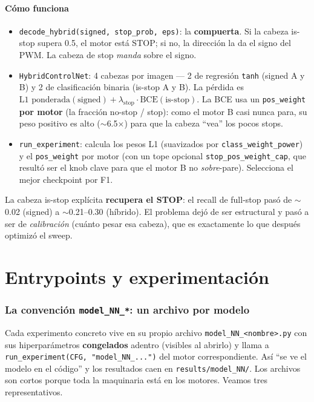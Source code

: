 \documentclass[11pt,a4paper]{article}
\newcommand{\code}[1]{\lstinline[basicstyle=\ttfamily\normalsize]|#1|}
\begin{document}


\subsection*{Cómo funciona}
\begin{itemize}
  \item \code{decode_hybrid(signed, stop_prob, eps)}: la \textbf{compuerta}. Si la cabeza is-stop supera 0.5,
  el motor está STOP; si no, la dirección la da el signo del PWM. La cabeza de stop \emph{manda} sobre el signo.
  \item \code{HybridControlNet}: 4 cabezas por imagen --- 2 de regresión \code{tanh} (signed A y B) y 2 de
  clasificación binaria (is-stop A y B). La pérdida es
  $\text{L1 ponderada}(\text{signed}) + \lambda_{\text{stop}}\cdot\text{BCE}(\text{is-stop})$. La BCE usa un
  \code{pos_weight} \textbf{por motor} (la fracción no-stop / stop): como el motor B casi nunca para, su peso
  positivo es alto ($\sim$6.5$\times$) para que la cabeza ``vea'' los pocos stops.
  \item \code{run_experiment}: calcula los pesos L1 (suavizados por \code{class_weight_power}) y el
  \code{pos_weight} por motor (con un tope opcional \code{stop_pos_weight_cap}, que resultó ser el knob clave
  para que el motor B no \emph{sobre}-pare). Selecciona el mejor checkpoint por F1.
\end{itemize}

\begin{nota}
La cabeza is-stop explícita \textbf{recupera el STOP}: el recall de full-stop pasó de $\sim$0.02 (signed) a
$\sim$0.21--0.30 (híbrido). El problema dejó de ser estructural y pasó a ser de \emph{calibración} (cuánto
pesar esa cabeza), que es exactamente lo que después optimizó el sweep.
\end{nota}

\part{Entrypoints y experimentación}

\section{La convención \texttt{model\_NN\_*}: un archivo por modelo}
Cada experimento concreto vive en su propio archivo \code{model_NN_<nombre>.py} con sus hiperparámetros
\textbf{congelados} adentro (visibles al abrirlo) y llama a \code{run_experiment(CFG, "model_NN_...")} del motor
correspondiente. Así ``se ve el modelo en el código'' y los resultados caen en \code{results/model_NN/}. Los
archivos son cortos porque toda la maquinaria está en los motores. Veamos tres representativos.
\end{document}
